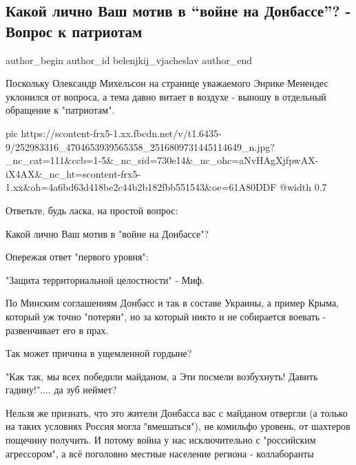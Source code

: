  
 
 
 
 
 
\subsection{Какой лично Ваш мотив в \enquote{войне на Донбассе}? - Вопрос к патриотам}
\label{sec:04_11_2021.fb.belenjkij_vjacheslav.1.patriotizm_vojna_donbass}
 
\ifcmt
 author_begin
   author_id belenjkij_vjacheslav
 author_end
\fi

Поскольку Олександр Михельсон на странице уважаемого Энрике Менендес уклонился
от вопроса, а тема давно витает в воздухе - выношу в отдельный обращение к
"патриотам".

\ifcmt
  pic https://scontent-frx5-1.xx.fbcdn.net/v/t1.6435-9/252983316_4704653939565358_2516809731445114649_n.jpg?_nc_cat=111&ccb=1-5&_nc_sid=730e14&_nc_ohc=aNvHAgXjfpwAX-iX4AX&_nc_ht=scontent-frx5-1.xx&oh=4a6bd63d418be2c44b2b182fbb551543&oe=61A80DDF
  @width 0.7
\fi

Ответьте, будь ласка, на простой вопрос: 

Какой лично Ваш мотив в "войне на Донбассе"?

Опережая ответ "первого уровня":

"Защита территориальной целостности" - Миф.

По Минским соглашениям Донбасс и так в составе Украины, а пример Крыма, который
уж точно "потерян", но за который никто и не собирается воевать - развенчивает
его в прах.

Так может причина в ущемленной гордыне?

"Как так, мы всех победили майданом, а Эти посмели возбухнуть! Давить
гадину!".... да зуб неймет?

Нельзя же признать, что это жители Донбасса вас с майданом отвергли (а только
на таких условиях Россия могла "вмешаться"), не комильфо уровень, от шахтеров
пощечину получить. И потому война у нас исключительно с "российским
агрессором", а всё поголовно местные население региона - коллаборанты 

